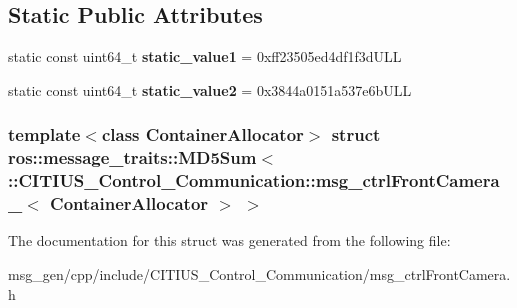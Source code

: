 \subsection*{\-Static \-Public \-Attributes}
\begin{DoxyCompactItemize}
\item 
\hypertarget{structros_1_1message__traits_1_1_m_d5_sum_3_01_1_1_c_i_t_i_u_s___control___communication_1_1msg_2297bd9bc71bdea83030df67493dd5bb_a96998679e800a19b53bbbec173f34177}{static const uint64\-\_\-t {\bfseries static\-\_\-value1} = 0xff23505ed4df1f3d\-U\-L\-L}\label{structros_1_1message__traits_1_1_m_d5_sum_3_01_1_1_c_i_t_i_u_s___control___communication_1_1msg_2297bd9bc71bdea83030df67493dd5bb_a96998679e800a19b53bbbec173f34177}

\item 
\hypertarget{structros_1_1message__traits_1_1_m_d5_sum_3_01_1_1_c_i_t_i_u_s___control___communication_1_1msg_2297bd9bc71bdea83030df67493dd5bb_ab77c54d852c01e15ab9441e7a43aa31f}{static const uint64\-\_\-t {\bfseries static\-\_\-value2} = 0x3844a0151a537e6b\-U\-L\-L}\label{structros_1_1message__traits_1_1_m_d5_sum_3_01_1_1_c_i_t_i_u_s___control___communication_1_1msg_2297bd9bc71bdea83030df67493dd5bb_ab77c54d852c01e15ab9441e7a43aa31f}

\end{DoxyCompactItemize}
\subsubsection*{template$<$class Container\-Allocator$>$ struct ros\-::message\-\_\-traits\-::\-M\-D5\-Sum$<$ \-::\-C\-I\-T\-I\-U\-S\-\_\-\-Control\-\_\-\-Communication\-::msg\-\_\-ctrl\-Front\-Camera\-\_\-$<$ Container\-Allocator $>$ $>$}



\-The documentation for this struct was generated from the following file\-:\begin{DoxyCompactItemize}
\item 
msg\-\_\-gen/cpp/include/\-C\-I\-T\-I\-U\-S\-\_\-\-Control\-\_\-\-Communication/msg\-\_\-ctrl\-Front\-Camera.\-h\end{DoxyCompactItemize}
